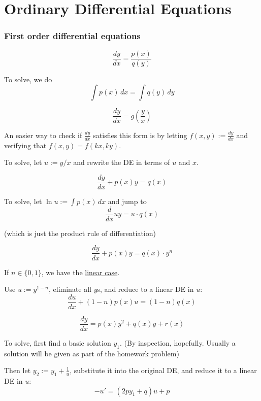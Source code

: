 \chapter{Ordinary Differential Equations}\label{e598fa6}

\subsection{First order differential equations}\label{e55966b}

\label{c4db619}

$$
  \frac{dy}{dx}=\frac{p(x)}{q(y)}
$$

To solve, we do
$$
  \int p(x)\,dx=\int q(y)\,dy
$$

\label{bb1ee90}

$$
  \frac{dy}{dx}=g\left(\frac yx\right)
$$

An easier way to check if $\displaystyle\frac{dy}{dx}$ satisfies this form is
by letting $f(x,y):=\displaystyle\frac{dy}{dx}$ and verifying that
$f(x,y)=f(kx,ky)$.

To solve, let $u:=y/x$ and rewrite the DE in terms of $u$ and $x$.

\label{b8c7e19}

$$
  \frac{dy}{dx}+p(x)y=q(x)
$$

To solve, let $\ln u:=\int p(x)\,dx$ and jump to
$$
  \frac d{dx}uy=u\cdot q(x)
$$

(which is just the product rule of differentiation)

\label{dc54d9b}

$$
  \frac{dy}{dx}+p(x)y=q(x)\cdot y^n
$$

If $n\in\{0,1\}$, we have the \href{b8c7e19}{linear case}.

Use $u:=y^{1-n}$, eliminate all $y$s, and reduce to a linear DE in $u$:
$$
  \frac{du}{dx}+(1-n)p(x)u=(1-n)q(x)
$$

\label{e5b78d0}

$$
  \frac{dy}{dx}=p(x)y^2+q(x)y+r(x)
$$

To solve, first find a basic solution $y_1$. (By inspection, hopefully. Usually
a solution will be given as part of the homework problem)

Then let $\displaystyle y_2:=y_1+\frac1u$, substitute it into the original DE,
and reduce it to a linear DE in $u$:
$$
  -u'=(2py_1+q)u+p
$$


